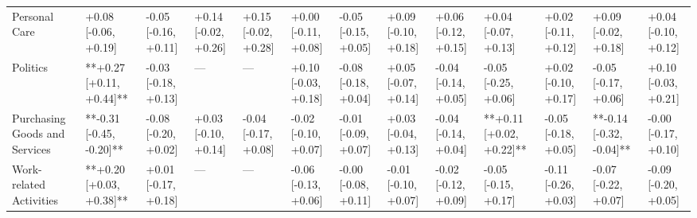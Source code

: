 \begin{tabular}{lllllllllllll}
Personal Care & +0.08 [-0.06, +0.19] & -0.05 [-0.16, +0.11] & +0.14 [-0.02, +0.26] & +0.15 [-0.02, +0.28] & +0.00 [-0.11, +0.08] & -0.05 [-0.15, +0.05] & +0.09 [-0.10, +0.18] & +0.06 [-0.12, +0.15] & +0.04 [-0.07, +0.13] & +0.02 [-0.11, +0.12] & +0.09 [-0.02, +0.18] & +0.04 [-0.10, +0.12] \\
Politics & **+0.27 [+0.11, +0.44]** & -0.03 [-0.18, +0.13] & — & — & +0.10 [-0.03, +0.18] & -0.08 [-0.18, +0.04] & +0.05 [-0.07, +0.14] & -0.04 [-0.14, +0.05] & -0.05 [-0.25, +0.06] & +0.02 [-0.10, +0.17] & -0.05 [-0.17, +0.06] & +0.10 [-0.03, +0.21] \\
Purchasing Goods and Services & **-0.31 [-0.45, -0.20]** & -0.08 [-0.20, +0.02] & +0.03 [-0.10, +0.14] & -0.04 [-0.17, +0.08] & -0.02 [-0.10, +0.07] & -0.01 [-0.09, +0.07] & +0.03 [-0.04, +0.13] & -0.04 [-0.14, +0.04] & **+0.11 [+0.02, +0.22]** & -0.05 [-0.18, +0.05] & **-0.14 [-0.32, -0.04]** & -0.00 [-0.17, +0.10] \\
Work-related Activities & **+0.20 [+0.03, +0.38]** & +0.01 [-0.17, +0.18] & — & — & -0.06 [-0.13, +0.06] & -0.00 [-0.08, +0.11] & -0.01 [-0.10, +0.07] & -0.02 [-0.12, +0.09] & -0.05 [-0.15, +0.17] & -0.11 [-0.26, +0.03] & -0.07 [-0.22, +0.07] & -0.09 [-0.20, +0.05] \\
\bottomrule
\end{tabular}
